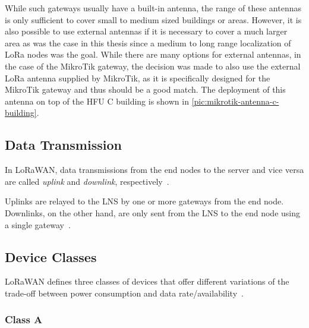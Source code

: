 While such gateways usually have a built-in antenna, the range of these antennas is only sufficient to cover small to medium sized buildings or areas.
However, it is also possible to use external antennas if it is necessary to cover a much larger area as was the case in this thesis since a medium to long range localization of \ac{LoRa} nodes was the goal.
While there are many options for external antennas, in the case of the MikroTik gateway, the decision was made to also use the external \ac{LoRa} antenna supplied by MikroTik, as it is specifically designed for the MikroTik gateway and thus should be a good match.
The deployment of this antenna on top of the \ac{HFU} C building is shown in \cref{pic:mikrotik-antenna-c-building}.

\subsection{Data Transmission}

In LoRaWAN, data transmissions from the end nodes to the server and vice versa are called \emph{uplink} and \emph{downlink}, respectively~\cite[p. 12]{lora_alliance_inc_lorawan_specification_2017}.

Uplinks are relayed to the \ac{LNS} by one or more gateways from the end node.
Downlinks, on the other hand, are only sent from the \ac{LNS} to the end node using a single gateway~\cite[p. 12]{lora_alliance_inc_lorawan_specification_2017}.

\subsection{Device Classes}

\ac{LoRaWAN} defines three classes of devices that offer different variations of the trade-off between power consumption and data rate/availability~\cite[p. 10]{lora_alliance_inc_lorawan_specification_2017}.

\subsubsection{Class A}

